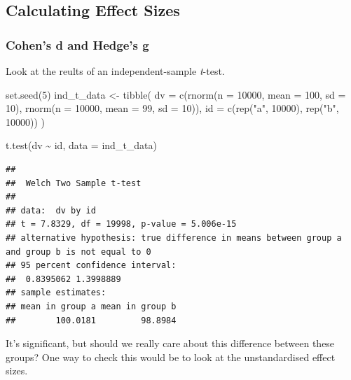 \documentclass[
]{book}
\newenvironment{Shaded}{\begin{snugshade}}{\end{snugshade}}
\newcommand{\AttributeTok}[1]{\textcolor[rgb]{0.77,0.63,0.00}{#1}}
\newcommand{\DecValTok}[1]{\textcolor[rgb]{0.00,0.00,0.81}{#1}}
\newcommand{\FunctionTok}[1]{\textcolor[rgb]{0.00,0.00,0.00}{#1}}
\newcommand{\NormalTok}[1]{#1}
\newcommand{\OtherTok}[1]{\textcolor[rgb]{0.56,0.35,0.01}{#1}}
\newcommand{\SpecialCharTok}[1]{\textcolor[rgb]{0.00,0.00,0.00}{#1}}
\newcommand{\StringTok}[1]{\textcolor[rgb]{0.31,0.60,0.02}{#1}}
\begin{document}
\hypertarget{calculating-effect-sizes}{%
\subsection{Calculating Effect Sizes}\label{calculating-effect-sizes}}

\hypertarget{cohens-d-and-hedges-g}{%
\subsubsection{Cohen's d and Hedge's g}\label{cohens-d-and-hedges-g}}

Look at the reults of an independent-sample \emph{t}-test.

\begin{Shaded}
\begin{Highlighting}[]
\FunctionTok{set.seed}\NormalTok{(}\DecValTok{5}\NormalTok{)}
\NormalTok{ind\_t\_data }\OtherTok{\textless{}{-}} \FunctionTok{tibble}\NormalTok{(}
  \AttributeTok{dv =} \FunctionTok{c}\NormalTok{(}\FunctionTok{rnorm}\NormalTok{(}\AttributeTok{n =} \DecValTok{10000}\NormalTok{, }\AttributeTok{mean =} \DecValTok{100}\NormalTok{, }\AttributeTok{sd =} \DecValTok{10}\NormalTok{),}
         \FunctionTok{rnorm}\NormalTok{(}\AttributeTok{n =} \DecValTok{10000}\NormalTok{, }\AttributeTok{mean =} \DecValTok{99}\NormalTok{, }\AttributeTok{sd =} \DecValTok{10}\NormalTok{)),}
  \AttributeTok{id =} \FunctionTok{c}\NormalTok{(}\FunctionTok{rep}\NormalTok{(}\StringTok{"a"}\NormalTok{, }\DecValTok{10000}\NormalTok{), }\FunctionTok{rep}\NormalTok{(}\StringTok{"b"}\NormalTok{, }\DecValTok{10000}\NormalTok{))}
\NormalTok{  )}
  
\FunctionTok{t.test}\NormalTok{(dv }\SpecialCharTok{\textasciitilde{}}\NormalTok{ id, }\AttributeTok{data =}\NormalTok{ ind\_t\_data)}
\end{Highlighting}
\end{Shaded}

\begin{verbatim}
## 
##  Welch Two Sample t-test
## 
## data:  dv by id
## t = 7.8329, df = 19998, p-value = 5.006e-15
## alternative hypothesis: true difference in means between group a and group b is not equal to 0
## 95 percent confidence interval:
##  0.8395062 1.3998889
## sample estimates:
## mean in group a mean in group b 
##        100.0181         98.8984
\end{verbatim}

It's significant, but should we really care about this difference between these groups? One way to check this would be to look at the unstandardised effect sizes.
\end{document}
